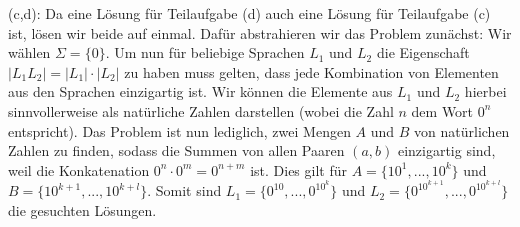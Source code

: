 \documentclass[a4paper]{article}
\begin{document}
	(c,d): Da eine Lösung für Teilaufgabe (d) auch eine Lösung für Teilaufgabe (c) ist, lösen wir beide auf einmal.
	Dafür abstrahieren wir das Problem zunächst: Wir wählen $\Sigma = \big\{ 0 \big\}$.
	Um nun für beliebige Sprachen $L_{1}$ und $L_{2}$ die Eigenschaft $\lvert L_{1}L_{2} \rvert = \lvert L_{1} \rvert \cdot \lvert L_{2} \rvert$
	zu haben muss gelten, dass jede Kombination von Elementen aus den Sprachen einzigartig ist.
	Wir können die Elemente aus $L_{1}$ und $L_{2}$ hierbei sinnvollerweise als natürliche Zahlen darstellen (wobei die Zahl $n$ dem Wort $0^n$ entspricht).
	Das Problem ist nun lediglich, zwei Mengen $A$ und $B$ von natürlichen Zahlen zu finden, sodass die Summen von allen Paaren $(a,b)$ einzigartig sind,
	weil die Konkatenation $0^n \cdot 0^m = 0^{n+m}$ ist. Dies gilt für $A = \big\{ 10^1,...,10^k \big\}$ und $B = \big\{ 10^{k+1},...,10^{k+l} \big\}$.
	Somit sind $L_{1} = \big\{ 0^{10},...,0^{10^k} \big\}$ und $L_{2} = \big\{ 0^{10^{k+1}},...,0^{10^{k+l}} \big\}$ die gesuchten Lösungen.
	
\end{document}
